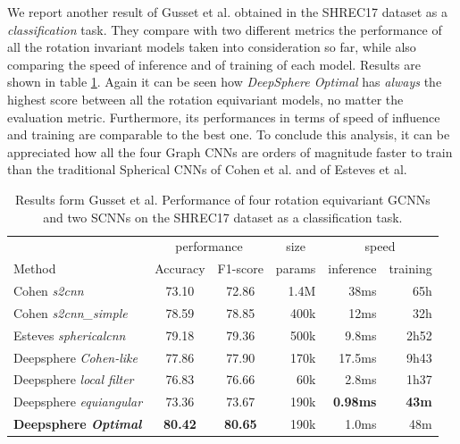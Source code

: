 We report another result of Gusset et al. \cite{Gusset} obtained in the SHREC17 dataset as a \textit{classification} task. They compare with two different metrics the performance of all the rotation invariant models taken into consideration so far, while also comparing the speed of inference and of training of each model. Results are shown in table \ref{tab:SHREC17_class}. Again it can be seen how \textit{DeepSphere Optimal} has \textit{always} the highest score between all the rotation equivariant models, no matter the evaluation metric. Furthermore, its performances in terms of speed of influence and training are comparable to the best one. To conclude this analysis, it can be appreciated how all the four Graph CNNs are orders of magnitude faster to train than the traditional Spherical CNNs of Cohen et al. and of Esteves et al. 
\begin{table}[ht]
	\centering
	\begin{tabular}{l|c c r r r}
		\multicolumn{1}{l}{} & \multicolumn{2}{c}{performance} & \multicolumn{1}{c}{size} & \multicolumn{2}{c}{speed}\\
		\cmidrule(lr){2-3} \cmidrule(lr){4-4} \cmidrule(lr){5-6}
		\multicolumn{1}{l}{Method} & Accuracy & F1-score & params & inference & training \\ \hline
		Cohen \emph{s2cnn} & 73.10 & 72.86 & 1.4M & 38ms & 65h\\
		Cohen \emph{s2cnn\_simple} & 78.59 & 78.85 & 400k & 12ms & 32h\\
		Esteves \emph{sphericalcnn} & 79.18 & 79.36 & 500k & 9.8ms & 2h52\\ \hline
		Deepsphere \emph{Cohen-like} & 77.86 & 77.90 & 170k & 17.5ms & 9h43\\
		Deepsphere \emph{local filter} & 76.83 & 76.66 & 60k & 2.8ms & 1h37\\
		Deepsphere \emph{equiangular} & 73.36 & 73.67 & 190k & \textbf{0.98ms} & \textbf{43m} \\
		\textbf{Deepsphere \emph{Optimal}} & \textbf{80.42} & \textbf{80.65} & 190k & 1.0ms & 48m
	\end{tabular}
	\caption{Results form Gusset et al. Performance of four rotation equivariant GCNNs and two SCNNs on the SHREC17 dataset as a classification task.}
	\label{tab:SHREC17_class}
\end{table}

